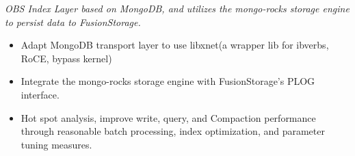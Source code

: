 \documentclass{resume}
\begin{document}
\textit{OBS Index Layer based on MongoDB, and utilizes the mongo-rocks storage engine to persist data to FusionStorage.}
\begin{onehalfspacing}
\begin{itemize}
  \item Adapt MongoDB transport layer to use libxnet(a wrapper lib for ibverbs, RoCE, bypass kernel)
  \item Integrate the mongo-rocks storage engine with FusionStorage's PLOG interface.
  \item Hot spot analysis, improve write, query, and Compaction performance through reasonable batch processing, index optimization, and parameter tuning measures.
\end{itemize}
\end{onehalfspacing}
\end{document}
